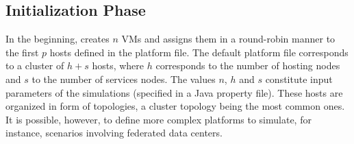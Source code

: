 
\subsection{Initialization Phase}

In the beginning, \vmps creates $n$ VMs and assigns them in a
round-robin manner to the first $p$ hosts defined in the platform
file.  The default platform file corresponds to a cluster of $h+s$
hosts, where $h$ corresponds to the number of hosting nodes and $s$ to
the number of services nodes. The values $n$, $h$ and $s$ constitute
input parameters of the simulations (specified in a Java property
file).
These hosts are organized in form of topologies, a cluster topology
being the most common ones. It is possible, however, to define more
complex platforms to simulate, for instance, scenarios involving
federated data centers.

